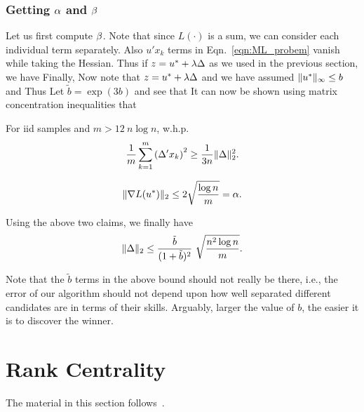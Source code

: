 \documentclass[letterpaper, 11pt, reqno]{amsart}
\begin{document}
\subsubsection{Getting $\alpha$ and $\beta$}
Let us first compute $\beta$. Note that since $L(\cdot)$ is a sum, we can consider each individual term separately. Also $u' x_k$ terms in Eqn.~\eqref{eqn:ML_probem} vanish while taking the Hessian. Thus if $z = u^* + \lambda \Delta$ as we used in the previous section, we have
Finally,
Now note that $z = u^* + \lambda \Delta$ and we have assumed $\lVert u^*\rVert_\infty \leq b$ and  Thus
Let $\tilde{b} = \exp(3b)$ and see that
It can now be shown using matrix concentration inequalities that
\begin{claim}
For iid samples and $m > 12\ n \log n$, w.h.p.
$$
\frac{1}{m} \sum_{k=1}^m \left(\Delta' x_k\right)^2 \geq \frac{1}{3n} \lVert\Delta\rVert^2_2.
$$
\end{claim}
\begin{claim}
$$\lVert\nabla L(u^*)\rVert_2 \leq 2 \sqrt{\frac{\log n}{m}} = \alpha.$$
\end{claim}
Using the above two claims, we finally have
$$
\norm{\D}_2 \leq \f{\tilde{b}}{(1+\tilde{b})^2}\ \sqrt{\f{n^2 \log n}{m}}.
$$
\begin{remark}
Note that the $\tilde{b}$ terms in the above bound should not really be there, i.e., the error of our algorithm should not depend upon how well separated different candidates are in terms of their skills. Arguably, larger the value of $b$, the easier it is to discover the winner.

\end{remark}


\section{Rank Centrality}
The material in this section follows~\cite{rank_centrality}.

{
\linespread{1.5}


}
\end{document}

